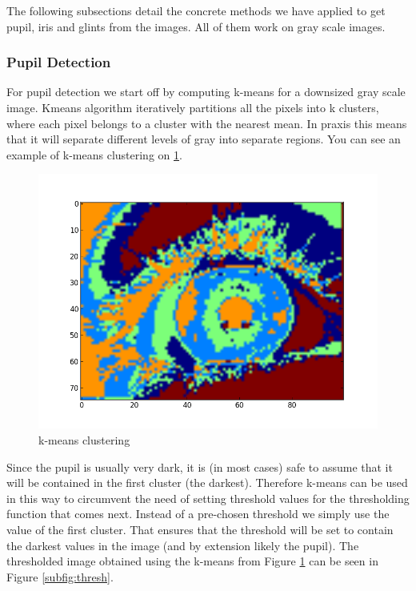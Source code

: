 The following subsections detail the concrete methods we have applied to get pupil, iris and glints from the images. All of them work on gray scale images.

\subsubsection{Pupil Detection}
For pupil detection we start off by computing k-means for a downsized gray scale image. Kmeans algorithm iteratively partitions all the pixels into k clusters, where each pixel belongs to a cluster with the nearest mean. In praxis this means that it will separate different levels of gray into separate regions. You can see an example of k-means clustering on  \ref{fig:kmeans}.

\begin{figure}[h!]
\centering
\includegraphics[width=\columnwidth]{final/images/k-means.png}
\caption{k-means clustering}
\label{fig:kmeans}
\end{figure}

Since the pupil is usually very dark, it is (in most cases) safe to assume that it will be contained in the first cluster (the darkest). Therefore k-means can be used in this way to circumvent the need of setting threshold values for the thresholding function that comes next. Instead of a pre-chosen threshold we simply use the value of the first cluster. That ensures that the threshold will be set to contain the darkest values in the image (and by extension likely the pupil). The thresholded image obtained using the k-means from Figure \ref{fig:kmeans} can be seen in Figure \ref{subfig:thresh}. 

